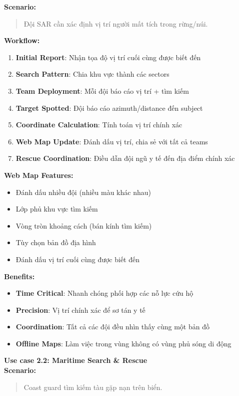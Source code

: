 \begin{itemize}
\textbf{Scenario:}
\begin{quote}
Đội SAR cần xác định vị trí người mất tích trong rừng/núi.
\end{quote}

\textbf{Workflow:}
\begin{enumerate}
    \item \textbf{Initial Report}: Nhận tọa độ vị trí cuối cùng được biết đến
    \item \textbf{Search Pattern}: Chia khu vực thành các sectors
    \item \textbf{Team Deployment}: Mỗi đội báo cáo vị trí + tìm kiếm
    \item \textbf{Target Spotted}: Đội báo cáo azimuth/distance đến subject
    \item \textbf{Coordinate Calculation}: Tính toán vị trí chính xác
    \item \textbf{Web Map Update}: Đánh dấu vị trí, chia sẻ với tất cả teams
    \item \textbf{Rescue Coordination}: Điều dẫn đội ngũ y tế đến địa điểm chính xác
\end{enumerate}
\textbf{Web Map Features:}
\begin{itemize}[label=\textbullet]
    \item Đánh dấu nhiều đội (nhiều màu khác nhau)
    \item Lớp phủ khu vực tìm kiếm
    \item Vòng tròn khoảng cách (bán kính tìm kiếm)
    \item Tùy chọn bản đồ địa hình
    \item Đánh dấu vị trí cuối cùng được biết đến
\end{itemize}
\textbf{Benefits:}
\begin{itemize}[label=\textbullet]
    \item \textbf{Time Critical}: Nhanh chóng phối hợp các nỗ lực cứu hộ
    \item \textbf{Precision}: Vị trí chính xác để sơ tán y tế
    \item \textbf{Coordination}: Tất cả các đội đều nhìn thấy cùng một bản đồ
    \item \textbf{Offline Maps}: Làm việc trong vùng không có vùng phủ sóng di động
\end{itemize}
\textbf{Use case 2.2: Maritime Search \& Rescue} \\

\textbf{Scenario:}
\begin{quote}
Coast guard tìm kiếm tàu gặp nạn trên biển.
\end{quote}


\end{itemize}
